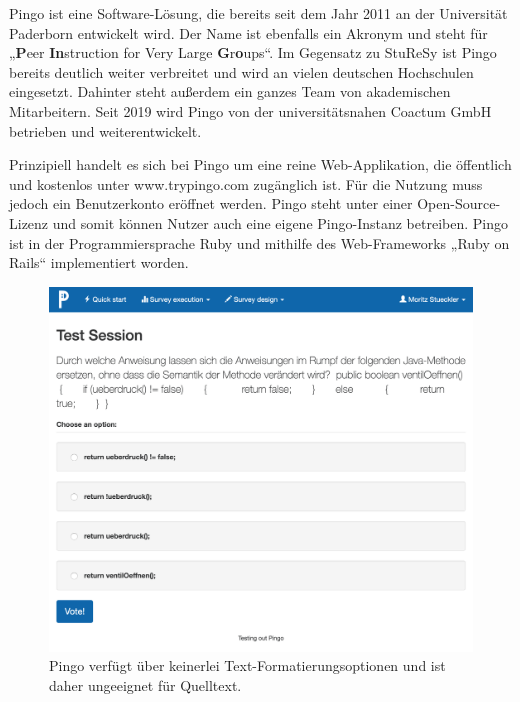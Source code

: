 Pingo ist eine Software-Lösung, die bereits seit dem Jahr 2011 an der Universität Paderborn entwickelt wird. Der Name ist ebenfalls ein Akronym und steht für „\textbf{P}eer \textbf{In}struction for Very Large \textbf{G}r\textbf{o}ups“. Im Gegensatz zu StuReSy ist Pingo bereits deutlich weiter verbreitet und wird an vielen deutschen Hochschulen eingesetzt. Dahinter steht außerdem ein ganzes Team von akademischen Mitarbeitern. Seit 2019 wird Pingo von der universitätsnahen Coactum GmbH betrieben und weiterentwickelt.\newline

Prinzipiell handelt es sich bei Pingo um eine reine Web-Applikation, die öffentlich und kostenlos unter www.trypingo.com zugänglich ist. Für die Nutzung muss jedoch ein Benutzerkonto eröffnet werden. Pingo steht unter einer Open-Source-Lizenz und somit können Nutzer auch eine eigene Pingo-Instanz betreiben. Pingo ist in der Programmiersprache Ruby und mithilfe des Web-Frameworks „Ruby on Rails“ implementiert worden.

\begin{figure}[H]
    \includegraphics[width=12cm]{chapter/bewertung/bilder/pingo_problem1.png}
    \centering
    \caption{Pingo verfügt über keinerlei Text-Formatierungsoptionen und ist daher ungeeignet für Quelltext.}
    \label{Abbildung 2.4}
\end{figure}